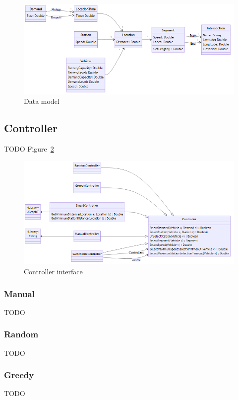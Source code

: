 \documentclass{article}
\begin{document}
    \begin{figure}
        \centering
        \includegraphics[width=\textwidth]{../../diagrams/model/classes-v0.png}
        \caption{Data model}
        \label{fig:1}
    \end{figure}

    \subsection{Controller}
    TODO Figure~\ref{fig:2}

    \begin{figure}
        \centering
        \includegraphics[width=\textwidth]{../../diagrams/controller/classes.png}
        \caption{Controller interface}
        \label{fig:2}
    \end{figure}

    \subsubsection{Manual}
    TODO

    \subsubsection{Random}
    TODO
    
    \subsubsection{Greedy}
    TODO
\end{document}

